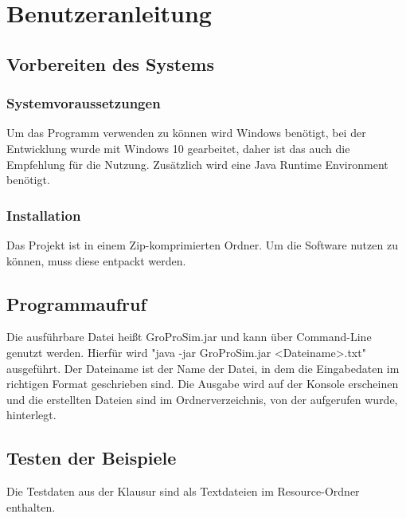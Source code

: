 \chapter{Benutzeranleitung}\label{ch:benutzeranleitung}


\section{Vorbereiten des Systems}\label{sec:vorbereiten-des-systems}

\subsection{Systemvoraussetzungen}\label{subsec:systemvoraussetzungen}
Um das Programm verwenden zu können wird Windows benötigt, bei der Entwicklung wurde mit Windows 10 gearbeitet, daher ist das auch die Empfehlung für die Nutzung.
Zusätzlich wird eine Java Runtime Environment benötigt.

\subsection{Installation}\label{subsec:installation}
Das Projekt ist in einem Zip-komprimierten Ordner.
Um die Software nutzen zu können, muss diese entpackt werden.


\section{Programmaufruf}\label{sec:programmaufruf}
Die ausführbare Datei heißt GroProSim.jar und kann über Command-Line genutzt werden.
Hierfür wird "java -jar GroProSim.jar <Dateiname>.txt" ausgeführt.
Der Dateiname ist der Name der Datei, in dem die Eingabedaten im richtigen Format geschrieben sind.
Die Ausgabe wird auf der Konsole erscheinen und die erstellten Dateien sind im Ordnerverzeichnis, von der aufgerufen wurde, hinterlegt.


\section{Testen der Beispiele}\label{sec:testen-der-beispiele}
Die Testdaten aus der Klausur sind als Textdateien im Resource-Ordner enthalten.